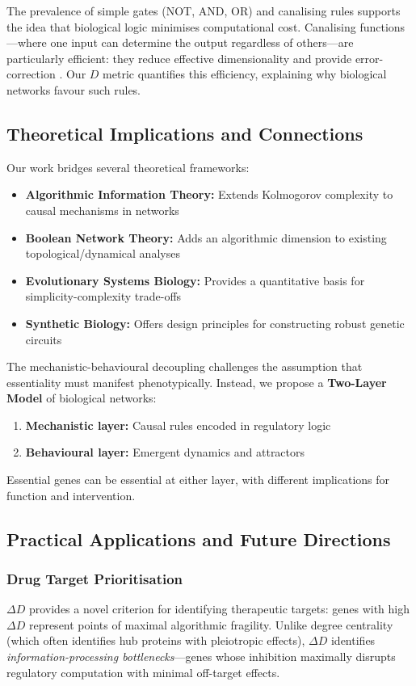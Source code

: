 \documentclass[12pt]{article}
\begin{document}
The prevalence of simple gates (NOT, AND, OR) and canalising rules supports the idea that biological logic minimises computational cost. Canalising functions—where one input can determine the output regardless of others—are particularly efficient: they reduce effective dimensionality and provide error-correction \cite{Kauffman2004}. Our \(D\) metric quantifies this efficiency, explaining why biological networks favour such rules.

\subsection{Theoretical Implications and Connections}

Our work bridges several theoretical frameworks:
\begin{itemize}
    \item \textbf{Algorithmic Information Theory:} Extends Kolmogorov complexity to causal mechanisms in networks
    \item \textbf{Boolean Network Theory:} Adds an algorithmic dimension to existing topological/dynamical analyses
    \item \textbf{Evolutionary Systems Biology:} Provides a quantitative basis for simplicity-complexity trade-offs
    \item \textbf{Synthetic Biology:} Offers design principles for constructing robust genetic circuits
\end{itemize}

The mechanistic-behavioural decoupling challenges the assumption that essentiality must manifest phenotypically. Instead, we propose a \textbf{Two-Layer Model} of biological networks:
\begin{enumerate}
    \item \textbf{Mechanistic layer:} Causal rules encoded in regulatory logic
    \item \textbf{Behavioural layer:} Emergent dynamics and attractors
\end{enumerate}
Essential genes can be essential at either layer, with different implications for function and intervention.

\subsection{Practical Applications and Future Directions}

\subsubsection{Drug Target Prioritisation}
\(\Delta D\) provides a novel criterion for identifying therapeutic targets: genes with high \(\Delta D\) represent points of maximal algorithmic fragility. Unlike degree centrality (which often identifies hub proteins with pleiotropic effects), \(\Delta D\) identifies \textit{information-processing bottlenecks}—genes whose inhibition maximally disrupts regulatory computation with minimal off-target effects.
\end{document}
